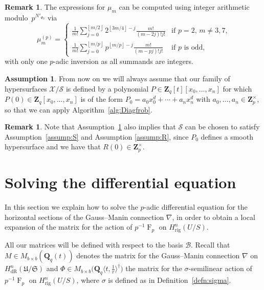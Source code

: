 \documentclass[a4paper,11pt]{article}
\numberwithin{equation}{section}
\providecommand{\floor}[1]{\left\lfloor#1\right\rfloor}   %
\newcommand{\ZZ}{\mathbf{Z}} %
\newcommand{\QQ}{\mathbf{Q}} %
\DeclareMathOperator{\Frob}{F}           %
\providecommand{\HdR}{H_{\text{dR}}}    %
\providecommand{\Hrig}{H_{\text{rig}}}  %
\providecommand{\cB}{\mathcal{B}} %
\theoremstyle{definition}
\newtheorem{rem}[thm]{Remark}
\newtheorem{assump}[thm]{Assumption}
\begin{document}
\begin{rem} \label{rem:mup}
The expressions for $\mu_m$ can be computed using integer arithmetic 
modulo~$p^{N'_{\Phi_0}}$ via 
\begin{equation*}
\mu_m^{(p)} = \begin{cases}
\frac{1}{m!} \sum_{j=0}^{\floor{m/2}} 2^{\floor{3m/4} - j} \frac{m!}{(m-2j)! j!}
    & \text{if $p = 2$, $m \neq 3, 7$,} \\
\frac{1}{m!} \sum_{j=0}^{\floor{m/p}} p^{\floor{m/p} - j} \frac{m!}{(m-pj)! j!}
    & \text{if $p$ is odd,}
\end{cases}
\end{equation*}
with only one $p$-adic inversion as all summands are integers. 
\end{rem}

\begin{assump} \label{assump:diag}
From now on we will always assume that our family of 
hypersurfaces $\mathcal{X}/\mathcal{S}$ is defined by a 
polynomial $P \in \ZZ_q[t][x_0,\dotsc,x_n]$ for which 
$P(0) \in \ZZ_q[x_0,\dotsc,x_n]$ is of the form 
$P_0=a_0 x_0^d + \dotsb + a_n x_n^d$ with $a_0,\dotsc,a_n \in \ZZ_p^{\times}$, 
so that we can apply Algorithm~\ref{alg:Diagfrob}. 
\end{assump}

\begin{rem}
Note that Assumption~\ref{assump:diag} 
also implies that $\mathcal{S}$ can be chosen to satisfy Assumption~\ref{assump:S} 
and Assumption \ref{assump:R}, since $P_0$ defines a smooth hypersurface and 
we have that $R(0) \in \ZZ_p^{\times}$. 
\end{rem}


\section{Solving the differential equation}
\label{sec:DifferentialSystem}

In this section we explain how to solve the $p$-adic differential 
equation for the horizontal sections of the Gauss--Manin 
connection $\nabla$, in order to obtain a local expansion of the 
matrix for the action of $p^{-1} \Frob_p$ on $\Hrig^{n}(U/S)$.  

All our matrices will be defined with respect to the basis $\cB$. Recall 
that $M \in M_{b \times b}(\QQ_q(t))$ denotes 
the matrix for the Gauss--Manin connection $\nabla$ on 
$\HdR^n(\mathfrak{U}/\mathfrak{S})$ and 
$\Phi \in M_{b \times b} \bigl(\QQ_q \langle t,\frac{1}{r} \rangle^{\dag} \bigr)$ 
the matrix for the $\sigma$-semilinear action of~$p^{-1} \Frob_p$ 
on $\Hrig^{n}(U/S)$, where $\sigma$ is defined as 
in Definition~\ref{defn:sigma}.
\end{document}
